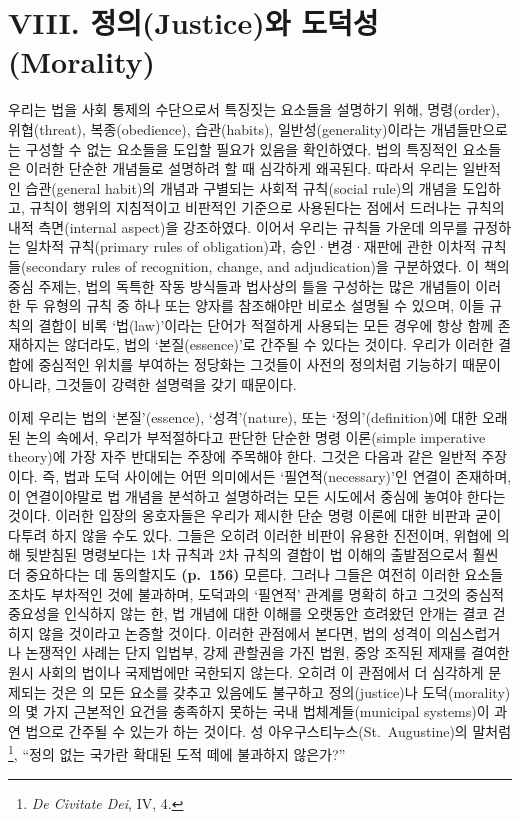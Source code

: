 \section{VIII. 정의(Justice)와
도덕성(Morality)}\label{viii.-uxc815uxc758justiceuxc640-uxb3c4uxb355uxc131morality}

우리는 법을 사회 통제의 수단으로서 특징짓는 요소들을 설명하기 위해,
명령(order), 위협(threat), 복종(obedience), 습관(habits),
일반성(generality)이라는 개념들만으로는 구성할 수 없는 요소들을 도입할
필요가 있음을 확인하였다. 법의 특징적인 요소들은 이러한 단순한 개념들로
설명하려 할 때 심각하게 왜곡된다. 따라서 우리는 일반적인 습관(general
habit)의 개념과 구별되는 사회적 규칙(social rule)의 개념을 도입하고,
규칙이 행위의 지침적이고 비판적인 기준으로 사용된다는 점에서 드러나는
규칙의 내적 측면(internal aspect)을 강조하였다. 이어서 우리는 규칙들
가운데 의무를 규정하는 일차적 규칙(primary rules of obligation)과,
승인·변경·재판에 관한 이차적 규칙들(secondary rules of recognition,
change, and adjudication)을 구분하였다. 이 책의 중심 주제는, 법의 독특한
작동 방식들과 법사상의 틀을 구성하는 많은 개념들이 이러한 두 유형의 규칙
중 하나 또는 양자를 참조해야만 비로소 설명될 수 있으며, 이들 규칙의
결합이 비록 `법(law)'이라는 단어가 적절하게 사용되는 모든 경우에 항상
함께 존재하지는 않더라도, 법의 `본질(essence)'로 간주될 수 있다는
것이다. 우리가 이러한 결합에 중심적인 위치를 부여하는 정당화는 그것들이
사전의 정의처럼 기능하기 때문이 아니라, 그것들이 강력한 설명력을 갖기
때문이다.

이제 우리는 법의 `본질'(essence), `성격'(nature), 또는
`정의'(definition)에 대한 오래된 논의 속에서, 우리가 부적절하다고 판단한
단순한 명령 이론(simple imperative theory)에 가장 자주 반대되는 주장에
주목해야 한다. 그것은 다음과 같은 일반적 주장이다. 즉, 법과 도덕
사이에는 어떤 의미에서든 `필연적(necessary)'인 연결이 존재하며, 이
연결이야말로 법 개념을 분석하고 설명하려는 모든 시도에서 중심에 놓여야
한다는 것이다. 이러한 입장의 옹호자들은 우리가 제시한 단순 명령 이론에
대한 비판과 굳이 다투려 하지 않을 수도 있다. 그들은 오히려 이러한 비판이
유용한 진전이며, 위협에 의해 뒷받침된 명령보다는 1차 규칙과 2차 규칙의
결합이 법 이해의 출발점으로서 훨씬 더 중요하다는 데 동의할지도
\textbf{(p.~156)} 모른다. 그러나 그들은 여전히 이러한 요소들조차도
부차적인 것에 불과하며, 도덕과의 `필연적' 관계를 명확히 하고 그것의
중심적 중요성을 인식하지 않는 한, 법 개념에 대한 이해를 오랫동안
흐려왔던 안개는 결코 걷히지 않을 것이라고 논증할 것이다. 이러한 관점에서
본다면, 법의 성격이 의심스럽거나 논쟁적인 사례는 단지 입법부, 강제
관할권을 가진 법원, 중앙 조직된 제재를 결여한 원시 사회의 법이나
국제법에만 국한되지 않는다. 오히려 이 관점에서 더 심각하게 문제되는 것은
의 모든 요소를
갖추고 있음에도 불구하고 정의(justice)나 도덕(morality)의 몇 가지
근본적인 요건을 충족하지 못하는 국내 법체계들(municipal systems)이 과연
법으로 간주될 수 있는가 하는 것이다. 성 아우구스티누스(St.~Augustine)의
말처럼\footnote{\emph{De Civitate Dei}, IV, 4.}, ``정의 없는 국가란
확대된 도적 떼에 불과하지 않은가?''

